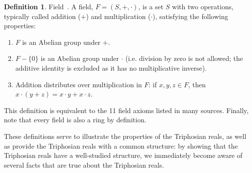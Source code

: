 \documentclass[11pt]{article}
\theoremstyle{definition}
\newtheorem{definition}{Definition}
\theoremstyle{plain}
\theoremstyle{remark}
\begin{document}
	\begin{definition}{Field~\cite{lang}.}
		A field, \(F = (S,+,\cdot)\), is a set \(S\) with two operations,
		typically called addition (\(+\)) and multiplication (\(\cdot\)),
		satisfying the following properties:
		\begin{enumerate}
			\item \(F\) is an Abelian group under \(+\).
			\item \(F - \{0\}\) is an Abelian group under \(\cdot\) (i.e.
			division by zero is not allowed; the additive identity is excluded
			as it has no multiplicative inverse).
			\item Addition distributes over multiplication in \(F\): if \(x,y,z
			\in F\), then \(x\cdot(y + z) = x\cdot y + x\cdot z\).
		\end{enumerate}
		This definition is equivalent to the 11 field axioms listed in many
		sources. Finally, note that every field is also a ring by definition.
	\end{definition}

	These definitions serve to illustrate the properties of the Triphosian
	reals, as well as provide the Triphosian reals with a common structure: by
	showing that the Triphosian reals have a well-studied structure, we
	immediately become aware of several facts that are true about the
	Triphosian reals.
\end{document}
